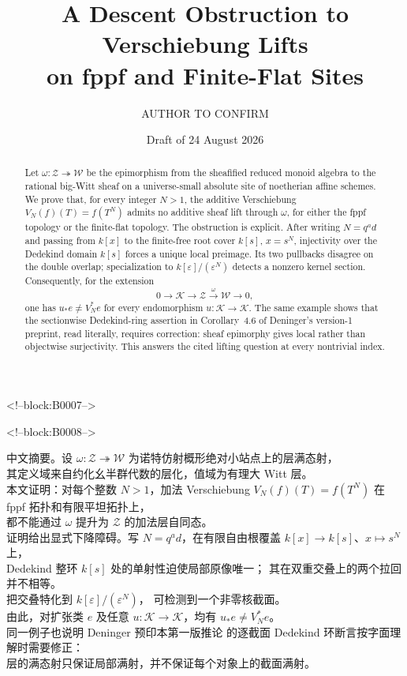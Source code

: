 \documentclass[11pt]{article}
\title{\textbf{A Descent Obstruction to Verschiebung Lifts\\
on fppf and Finite-Flat Sites}}
\author{AUTHOR TO CONFIRM}
\date{Draft of 24 August 2026}
\theoremstyle{definition}
\newcommand{\latin}[1]{{\rmfamily #1}}
\begin{document}
\maketitle

<!--block:B0007-->
\begin{abstract}
Let \(\omega\colon\mathcal Z\twoheadrightarrow\mathcal W\) be the
epimorphism from the sheafified reduced monoid algebra to the rational
big-Witt sheaf on a universe-small absolute site of noetherian affine
schemes.  We prove that, for every integer \(N>1\), the additive
Verschiebung \(V_N(f)(T)=f(T^N)\) admits no additive sheaf lift through
\(\omega\), for either the fppf topology or the finite-flat topology.
The obstruction is explicit.  After writing \(N=q^a d\) and passing from
\(k[x]\) to the finite-free root cover \(k[s]\), \(x=s^N\), injectivity
over the Dedekind domain \(k[s]\) forces a unique local preimage.  Its two
pullbacks disagree on the double overlap; specialization to
\(k[\varepsilon]/(\varepsilon^N)\) detects a nonzero kernel section.
Consequently, for the extension
\[
0\longrightarrow\mathcal K\longrightarrow\mathcal Z
 \xrightarrow{\omega}\mathcal W\longrightarrow0,
\]
one has \(u_*e\ne V_N^*e\) for every endomorphism
\(u\colon\mathcal K\to\mathcal K\).  The same example shows that the
sectionwise Dedekind-ring assertion in Corollary~4.6 of Deninger's
version-1 preprint, read literally, requires correction: sheaf
epimorphy gives local rather than objectwise surjectivity.
This answers the cited lifting question at every nontrivial index.
\end{abstract}

<!--block:B0008-->
\begin{center}
\begin{minipage}{0.94\textwidth}
{\zhfont\small\RaggedRight
中文摘要。设 \(\omega\colon\mathcal Z\twoheadrightarrow\mathcal W\)
为诺特仿射概形绝对小站点上的层满态射，\\
其定义域来自约化幺半群代数的层化，值域为有理大
\latin{Witt} 层。\\
本文证明：对每个整数 \(N>1\)，加法 \latin{Verschiebung}
\(V_N(f)(T)=f(T^N)\) 在 \latin{fppf} 拓扑和有限平坦拓扑上，\\
都不能通过 \(\omega\) 提升为 \(\mathcal Z\) 的加法层自同态。\\
证明给出显式下降障碍。写 \(N=q^a d\)，在有限自由根覆盖
\(k[x]\to k[s]\)、\(x\mapsto s^N\) 上，\\
\latin{Dedekind} 整环 \(k[s]\) 处的单射性迫使局部原像唯一；
其在双重交叠上的两个拉回并不相等。\\
把交叠特化到 \(k[\varepsilon]/(\varepsilon^N)\)，
可检测到一个非零核截面。\\
由此，对扩张类 \(e\) 及任意
\(u\colon\mathcal K\to\mathcal K\)，均有 \(u_*e\ne V_N^*e\)。\\
同一例子也说明 \latin{Deninger} 预印本第一版推论 \latin{4.6}
的逐截面 \latin{Dedekind} 环断言按字面理解时需要修正：\\
层的满态射只保证局部满射，并不保证每个对象上的截面满射。
}
\end{minipage}
\end{center}
\end{document}
